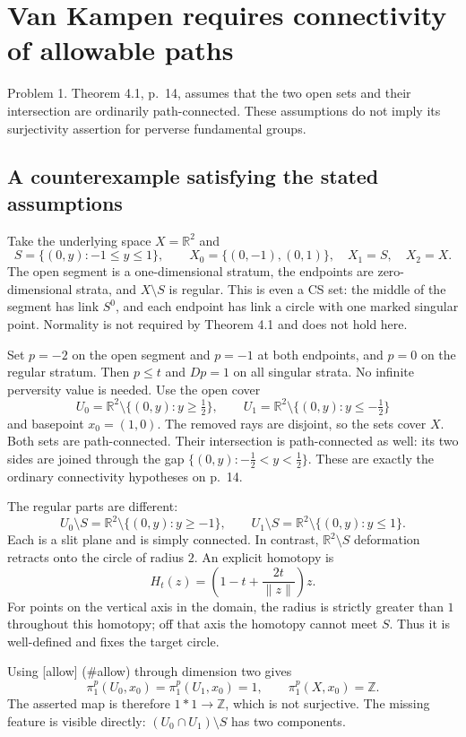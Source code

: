 \documentclass[10pt]{article}
\begin{document}
\section*{Van Kampen requires connectivity of allowable paths}
Problem 1.  Theorem 4.1, p. 14, assumes that the two open sets and their intersection are ordinarily path-connected. These assumptions do not imply its surjectivity assertion for perverse fundamental groups.\par
\subsection*{A counterexample satisfying the stated assumptions}
Take the underlying space \(X=\mathbb R^2\) and \[S=\{(0,y):-1\leq y\leq1\},\qquad
 X_0=\{(0,-1),(0,1)\},\quad X_1=S,\quad X_2=X.\] The open segment is a one-dimensional stratum, the endpoints are zero-dimensional strata, and \(X\setminus S\) is regular. This is even a CS set: the middle of the segment has link \(S^0\), and each endpoint has link a circle with one marked singular point. Normality is not required by Theorem 4.1 and does not hold here.\par
Set \(p=-2\) on the open segment and \(p=-1\) at both endpoints, and \(p=0\) on the regular stratum. Then \(p\leq t\) and \(Dp=1\) on all singular strata. No infinite perversity value is needed. Use the open cover \[U_0=\mathbb R^2\setminus\{(0,y):y\geq\tfrac12\},\qquad
 U_1=\mathbb R^2\setminus\{(0,y):y\leq-\tfrac12\}\] and basepoint \(x_0=(1,0)\). The removed rays are disjoint, so the sets cover \(X\). Both sets are path-connected. Their intersection is path-connected as well: its two sides are joined through the gap \(\{(0,y):-\tfrac12<y<\tfrac12\}\). These are exactly the ordinary connectivity hypotheses on p. 14.\par
The regular parts are different: \[U_0\setminus S=\mathbb R^2\setminus\{(0,y):y\geq-1\},\qquad
 U_1\setminus S=\mathbb R^2\setminus\{(0,y):y\leq1\}.\] Each is a slit plane and is simply connected. In contrast, \(\mathbb R^2\setminus S\) deformation retracts onto the circle of radius \(2\). An explicit homotopy is \[H_t(z)=\left(1-t+\frac{2t}{\lVert z\rVert}\right)z .\] For points on the vertical axis in the domain, the radius is strictly greater than \(1\) throughout this homotopy; off that axis the homotopy cannot meet \(S\). Thus it is well-defined and fixes the target circle.\par
Using [allow] (\#allow) through dimension two gives \[\pi_1^p(U_0,x_0)=\pi_1^p(U_1,x_0)=1,\qquad
 \pi_1^p(X,x_0)=\mathbb Z .\] The asserted map is therefore \(1*1\longrightarrow\mathbb Z\), which is not surjective. The missing feature is visible directly: \((U_0\cap U_1)\setminus S\) has two components.\par
\end{document}
